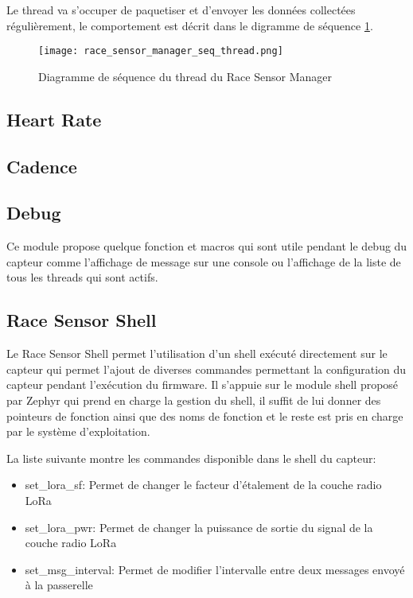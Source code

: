 Le thread va s'occuper de paquetiser et d'envoyer les données collectées régulièrement, le comportement est décrit dans le digramme de séquence \ref{fig:race_sensor_manager_init_thread}.

\begin{figure}[htb]
\centering 
\texttt{[image: race\_sensor\_manager\_seq\_thread.png]} 
\caption{Diagramme de séquence du thread du Race Sensor Manager}
\label{fig:race_sensor_manager_init_thread}
\end{figure}

\subsection{Heart Rate}

\todo{}

\subsection{Cadence}

\todo{}

\subsection{Debug}

Ce module propose quelque fonction et macros qui sont utile pendant le debug du capteur comme l'affichage de message sur une console ou l'affichage de la liste de tous les threads qui sont actifs.

\subsection{Race Sensor Shell}

Le Race Sensor Shell permet l'utilisation d'un shell exécuté directement sur le capteur qui permet l'ajout de diverses commandes permettant la configuration du capteur pendant l'exécution du firmware. Il s'appuie sur le module shell proposé par Zephyr qui prend en charge la gestion du shell, il suffit de lui donner des pointeurs de fonction ainsi que des noms de fonction et le reste est pris en charge par le système d'exploitation.

La liste suivante montre les commandes disponible dans le shell du capteur:

\begin{itemize}
\item set\_lora\_sf: Permet de changer le facteur d'étalement de la couche radio LoRa
\item set\_lora\_pwr: Permet de changer la puissance de sortie du signal de la couche radio LoRa
\item set\_msg\_interval: Permet de modifier l'intervalle entre deux messages envoyé à la passerelle
\end{itemize}

